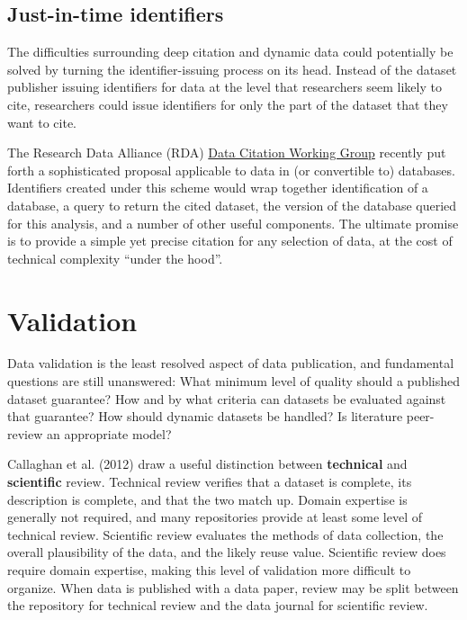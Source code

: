 \documentclass[10pt,a4paper,twocolumn]{article}
\begin{document}
{{\subsection*{Just-in-time identifiers}\label{just-in-time-identifiers}

The difficulties surrounding deep citation and dynamic data could potentially be solved by turning the identifier-issuing process on its head.
Instead of the dataset publisher issuing identifiers for data at the level that researchers seem likely to cite, researchers could issue identifiers for only the part of the dataset that they want to cite.

The Research Data Alliance (RDA) \href{http://rd-alliance.org/working-groups/data-citation-wg.html}{Data Citation Working Group} recently put forth a sophisticated proposal applicable to data in (or convertible to) databases.
Identifiers created under this scheme would wrap together identification of a database, a query to return the cited dataset, the version of the database queried for this analysis, and a number of other useful components.
The ultimate promise is to provide a simple yet precise citation for any selection of data, at the cost of technical complexity ``under the hood''.


\section*{Validation}\label{validation}

Data validation is the least resolved aspect of data publication, and fundamental questions are still unanswered:
What minimum level of quality should a published dataset guarantee?
How and by what criteria can datasets be evaluated against that guarantee?
How should dynamic datasets be handled?
Is literature peer-review an appropriate model?

Callaghan et al. (2012)\cite{callaghan_making_2012} draw a useful distinction between \textbf{technical} and \textbf{scientific} review.
Technical review verifies that a dataset is complete, its description is complete, and that the two match up.
Domain expertise is generally not required, and many repositories provide at least some level of technical review.
Scientific review evaluates the methods of data collection, the overall plausibility of the data, and the likely reuse value.
Scientific review does require domain expertise, making this level of validation more difficult to organize\cite{doorn_lies_2013}.
When data is published with a data paper, review may be split between the repository for technical review and the data journal for scientific review.

}}
\end{document}
